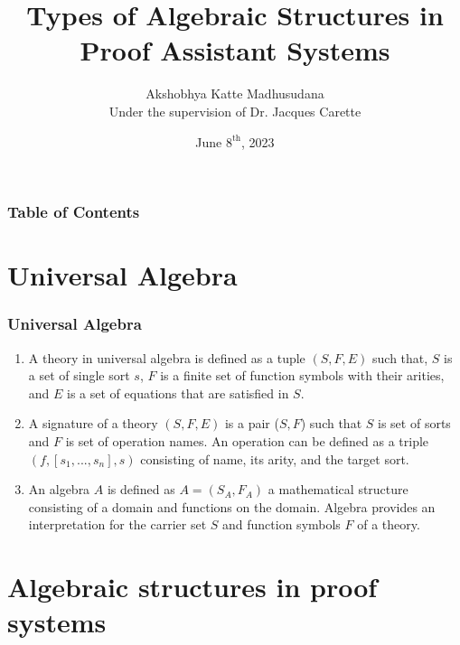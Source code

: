\documentclass[xcolor={dvipsnames}]{beamer}
\title[Algebra in Proof Systems]{Types of Algebraic Structures in Proof Assistant Systems}
\author[Akshobhya K M]{Akshobhya Katte Madhusudana\\\small{}Under the supervision of Dr. Jacques Carette}
\institute[McMaster University]{McMaster University}
\date{June $8^{\text{th}}$, 2023}
\begin{document}
\frame{\titlepage}


\begin{frame}
\frametitle{Table of Contents}
\tableofcontents
\end{frame}

\section{Universal Algebra}

\begin{frame}
  \frametitle{Universal Algebra}

  \begin{enumerate}
    \item A theory in universal algebra is defined as a tuple $(S,F,E)$ such that, $S$ is
    a set of single sort $s$, $F$ is a finite set of function symbols with their
    arities, and $E$ is a set of equations that are satisfied in $S$.
    \item A signature of a theory $(S,F,E)$ is a pair ($S,F$) such that $S$ is set of
    sorts and $F$ is set of operation names. An operation can be defined as a triple
    $(f,[s_1,...,s_n],s)$ consisting of name, its arity, and the target sort. 
    \item An algebra $A$ is defined as $A = (S_A,F_A)$ a mathematical structure consisting
    of a domain and functions on the domain. Algebra provides an interpretation for
    the carrier set $S$ and function symbols $F$ of a theory.    
  \end{enumerate}
\end{frame}

\section{Algebraic structures in proof systems}
\end{document}
